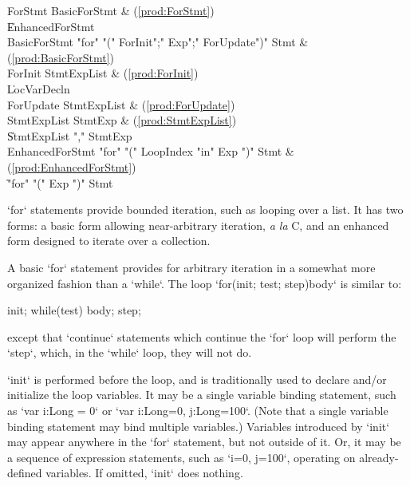 \begin{bbgrammar}
             ForStmt \: BasicForStmt & (\ref{prod:ForStmt}) \\
                     \| EnhancedForStmt \\
        BasicForStmt \: \xcd"for" \xcd"(" ForInit\opt \xcd";" Exp\opt \xcd";" ForUpdate\opt \xcd")" Stmt & (\ref{prod:BasicForStmt}) \\
             ForInit \: StmtExpList & (\ref{prod:ForInit}) \\
                     \| LocVarDecln \\
           ForUpdate \: StmtExpList & (\ref{prod:ForUpdate}) \\
         StmtExpList \: StmtExp & (\ref{prod:StmtExpList}) \\
                     \| StmtExpList \xcd"," StmtExp \\
     EnhancedForStmt \: \xcd"for" \xcd"(" LoopIndex \xcd"in" Exp \xcd")" Stmt & (\ref{prod:EnhancedForStmt}) \\
                     \| \xcd"for" \xcd"(" Exp \xcd")" Stmt \\
\end{bbgrammar}

\xcd`for` statements provide bounded iteration, such as looping over a list.
It has two forms: a basic form allowing near-arbitrary iteration, {\em a la}
C, and an enhanced form designed to iterate over a collection.

A basic \xcd`for` statement provides for arbitrary iteration in a somewhat
more organized fashion than a \xcd`while`.  The loop 
\xcd`for(init; test; step)body` is
similar to: 
\begin{xten}
{
   init;
   while(test) {
      body;
      step;
   }
}
\end{xten}
\noindent
except that \xcd`continue` statements which continue the \xcd`for` loop will
perform the \xcd`step`, which, in the \xcd`while` loop, they will not do. 

\xcd`init` is performed before the loop, and is traditionally used to declare
and/or initialize the loop variables. It may be a single variable binding
statement, such as \xcd`var i:Long = 0` or \xcd`var i:Long=0, j:Long=100`. (Note
that a single variable binding statement may bind multiple variables.)
Variables introduced by \xcd`init` may appear anywhere in the \xcd`for`
statement, but not outside of it.  Or, it may be a sequence of expression
statements, such as \xcd`i=0, j=100`, operating on already-defined variables.
If omitted, \xcd`init` does nothing.

